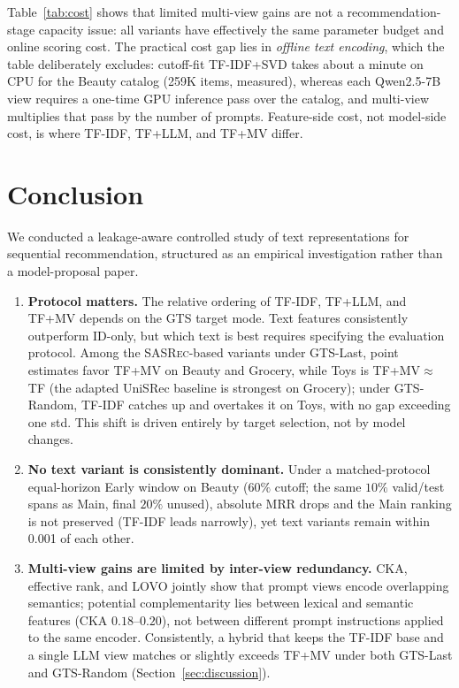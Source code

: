 \documentclass[sigconf,natbib=true,anonymous]{acmart}
\newcommand{\tfidf}{\textsc{TF-IDF}\xspace}
\newcommand{\tfllm}{\textsc{TF+LLM}\xspace}
\newcommand{\tfmv}{\textsc{TF+MV}\xspace}
\newcommand{\base}{\textsc{SASRec}\xspace}
\begin{document}
Table~\ref{tab:cost} shows that limited multi-view gains are not a recommendation-stage capacity issue: all variants have effectively the same parameter budget and online scoring cost.
The practical cost gap lies in \emph{offline text encoding}, which the table deliberately excludes: cutoff-fit \tfidf+SVD takes about a minute on CPU for the Beauty catalog (259K items, measured), whereas each Qwen2.5-7B view requires a one-time GPU inference pass over the catalog, and multi-view multiplies that pass by the number of prompts.
Feature-side cost, not model-side cost, is where \tfidf, \tfllm, and \tfmv differ.

\section{Conclusion}
\label{sec:conclusion}

We conducted a leakage-aware controlled study of text representations for sequential recommendation, structured as an empirical investigation rather than a model-proposal paper.

\begin{enumerate}[leftmargin=*,itemsep=1pt]
\item \textbf{Protocol matters.}
The relative ordering of \tfidf, \tfllm, and \tfmv depends on the GTS target mode.
Text features consistently outperform ID-only, but which text is best requires specifying the evaluation protocol.
Among the \base-based variants under GTS-Last, point estimates favor \tfmv on Beauty and Grocery, while Toys is TF+MV${}\approx{}$TF (the adapted UniSRec baseline is strongest on Grocery); under GTS-Random, \tfidf catches up and overtakes it on Toys, with no gap exceeding one std. This shift is driven entirely by target selection, not by model changes.
\item \textbf{No text variant is consistently dominant.}
Under a matched-protocol equal-horizon Early window on Beauty ($60\%$ cutoff; the same $10\%$ valid/\hspace{0pt}test spans as Main, final $20\%$ unused), absolute MRR drops and the Main ranking is not preserved (\tfidf leads narrowly), yet text variants remain within 0.001 of each other.
\item \textbf{Multi-view gains are limited by inter-view redundancy.}
CKA, effective rank, and LOVO jointly show that prompt views encode overlapping semantics; potential complementarity lies between lexical and semantic features (CKA $0.18$--$0.20$), not between different prompt instructions applied to the same encoder.
Consistently, a hybrid that keeps the \tfidf base and a single LLM view matches or slightly exceeds \tfmv under both GTS-Last and GTS-Random (Section~\ref{sec:discussion}).
\end{enumerate}
\end{document}

